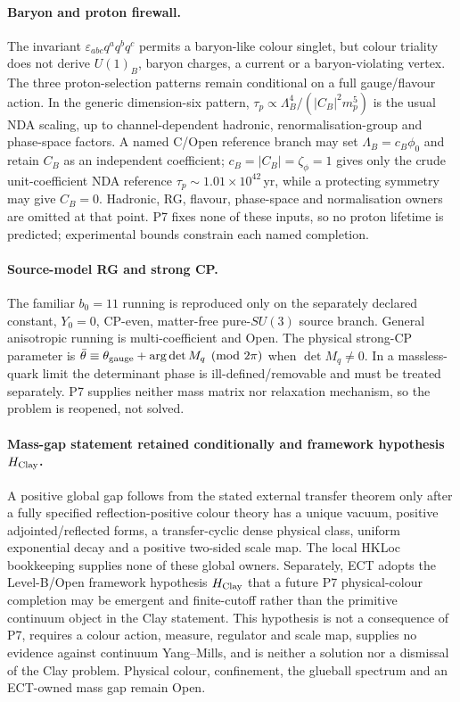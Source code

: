 \documentclass[11pt,a4paper]{article}
\begin{document}
\paragraph{Baryon and proton firewall.}
The invariant $\varepsilon_{abc}q^aq^bq^c$ permits a baryon-like colour
singlet, but colour triality does not derive $U(1)_B$, baryon charges, a
current or a baryon-violating vertex.  The three proton-selection patterns
remain conditional on a full gauge/flavour action.  In the generic
dimension-six pattern,
$\tau_p\propto\Lambda_B^4/(|C_B|^2m_p^5)$ is the usual NDA scaling, up to
channel-dependent hadronic, renormalisation-group and phase-space factors.  A
named C/Open reference branch may set $\Lambda_B=c_B\phi_0$ and retain $C_B$
as an independent coefficient; $c_B=|C_B|=\zeta_\phi=1$ gives only the
crude unit-coefficient NDA reference $\tau_p\sim1.01\times10^{42}$\,yr, while
a protecting symmetry may give $C_B=0$.  Hadronic, RG, flavour, phase-space
and normalisation owners are omitted at that point.  P7 fixes none of these
inputs, so no proton lifetime is predicted; experimental bounds constrain
each named completion.

\paragraph{Source-model RG and strong CP.}
The familiar $b_0=11$ running is reproduced only on the separately declared
constant, $Y_0=0$, CP-even, matter-free pure-$SU(3)$ source branch.  General
anisotropic running is multi-coefficient and Open.  The physical strong-CP
parameter is
$\bar\theta\equiv\theta_{\rm gauge}+\arg\det M_q\pmod{2\pi}$ when
$\det M_q\ne0$.  In a massless-quark limit the determinant phase is
ill-defined/removable and must be treated separately.  P7 supplies neither
mass matrix nor relaxation mechanism, so the problem is reopened, not solved.

\paragraph{Mass-gap statement retained conditionally and framework hypothesis
$H_{\rm Clay}$.}
A positive global gap follows from the stated external transfer theorem only
after a fully specified reflection-positive colour theory has a unique
vacuum, positive adjointed/reflected forms, a transfer-cyclic dense physical
class, uniform exponential decay and a positive two-sided scale map.  The
local HKLoc bookkeeping supplies none of these global owners.  Separately,
ECT adopts the Level-B/Open framework hypothesis $H_{\rm Clay}$ that a future
P7 physical-colour completion may be emergent and finite-cutoff rather than
the primitive continuum object in the Clay statement.  This hypothesis is
not a consequence of P7, requires a colour action, measure, regulator and
scale map, supplies no evidence against continuum Yang--Mills, and is neither
a solution nor a dismissal of the Clay problem.  Physical colour,
confinement, the glueball spectrum and an ECT-owned mass gap remain Open.
\end{document}
